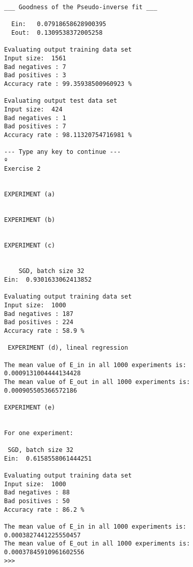 \begin{verbatim}
___ Goodness of the Pseudo-inverse fit ___

  Ein:   0.07918658628900395
  Eout:  0.1309538372005258

Evaluating output training data set
Input size:  1561
Bad negatives : 7
Bad positives : 3
Accuracy rate : 99.35938500960923 %

Evaluating output test data set
Input size:  424
Bad negatives : 1
Bad positives : 7
Accuracy rate : 98.11320754716981 %

--- Type any key to continue ---
º
Exercise 2


EXPERIMENT (a) 


EXPERIMENT (b) 


EXPERIMENT (c) 


	SGD, batch size 32
Ein:  0.9301633062413852

Evaluating output training data set
Input size:  1000
Bad negatives : 187
Bad positives : 224
Accuracy rate : 58.9 %

 EXPERIMENT (d), lineal regression

The mean value of E_in in all 1000 experiments is: 0.0009131004444134428
The mean value of E_out in all 1000 experiments is: 0.000905505366572186

EXPERIMENT (e)


For one experiment:

 SGD, batch size 32
Ein:  0.6158558061444251

Evaluating output training data set
Input size:  1000
Bad negatives : 88
Bad positives : 50
Accuracy rate : 86.2 %

The mean value of E_in in all 1000 experiments is: 0.0003827441225550457
The mean value of E_out in all 1000 experiments is: 0.00037845910961602556
>>> 

\end{verbatim}